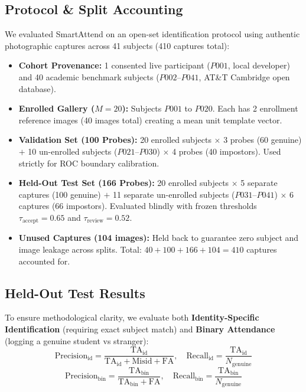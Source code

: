 \documentclass[conference]{IEEEtran}
\begin{document}
\subsection{Protocol \& Split Accounting}
We evaluated SmartAttend on an open-set identification protocol using authentic photographic captures across 41 subjects (410 captures total):
\begin{itemize}
    \item \textbf{Cohort Provenance:} 1 consented live participant ($P001$, local developer) and 40 academic benchmark subjects ($P002$--$P041$, AT\&T Cambridge open database).
    \item \textbf{Enrolled Gallery ($M = 20$):} Subjects $P001$ to $P020$. Each has 2 enrollment reference images (40 images total) creating a mean unit template vector.
    \item \textbf{Validation Set (100 Probes):} 20 enrolled subjects $\times$ 3 probes (60 genuine) $+$ 10 un-enrolled subjects ($P021$--$P030$) $\times$ 4 probes (40 impostors). Used strictly for ROC boundary calibration.
    \item \textbf{Held-Out Test Set (166 Probes):} 20 enrolled subjects $\times$ 5 separate captures (100 genuine) $+$ 11 separate un-enrolled subjects ($P031$--$P041$) $\times$ 6 captures (66 impostors). Evaluated blindly with frozen thresholds $\tau_{\text{accept}} = 0.65$ and $\tau_{\text{review}} = 0.52$.
    \item \textbf{Unused Captures (104 images):} Held back to guarantee zero subject and image leakage across splits. Total: $40 + 100 + 166 + 104 = 410$ captures accounted for.
\end{itemize}

\subsection{Held-Out Test Results}
To ensure methodological clarity, we evaluate both \textbf{Identity-Specific Identification} (requiring exact subject match) and \textbf{Binary Attendance} (logging a genuine student vs stranger):
\begin{equation}
\text{Precision}_{\text{id}} = \frac{\text{TA}_{\text{id}}}{\text{TA}_{\text{id}} + \text{Misid} + \text{FA}}, \quad \text{Recall}_{\text{id}} = \frac{\text{TA}_{\text{id}}}{N_{\text{genuine}}}
\end{equation}
\begin{equation}
\text{Precision}_{\text{bin}} = \frac{\text{TA}_{\text{bin}}}{\text{TA}_{\text{bin}} + \text{FA}}, \quad \text{Recall}_{\text{bin}} = \frac{\text{TA}_{\text{bin}}}{N_{\text{genuine}}}
\end{equation}
\end{document}
